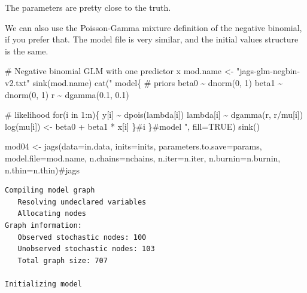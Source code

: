 \documentclass[
  13,
  letterpaper,
]{report}
\newenvironment{Shaded}{\begin{snugshade}}{\end{snugshade}}
\newcommand{\AttributeTok}[1]{\textcolor[rgb]{0.40,0.45,0.13}{#1}}
\newcommand{\CommentTok}[1]{\textcolor[rgb]{0.37,0.37,0.37}{#1}}
\newcommand{\ConstantTok}[1]{\textcolor[rgb]{0.56,0.35,0.01}{#1}}
\newcommand{\FunctionTok}[1]{\textcolor[rgb]{0.28,0.35,0.67}{#1}}
\newcommand{\NormalTok}[1]{\textcolor[rgb]{0.00,0.23,0.31}{#1}}
\newcommand{\OtherTok}[1]{\textcolor[rgb]{0.00,0.23,0.31}{#1}}
\newcommand{\StringTok}[1]{\textcolor[rgb]{0.13,0.47,0.30}{#1}}
\begin{document}
The parameters are pretty close to the truth.

We can also use the Poisson-Gamma mixture definition of the negative
binomial, if you prefer that. The model file is very similar, and the
initial values structure is the same.

\begin{Shaded}
\begin{Highlighting}[]
\CommentTok{\# Negative binomial GLM with one predictor x}
\NormalTok{mod.name }\OtherTok{\textless{}{-}} \StringTok{"jags{-}glm{-}negbin{-}v2.txt"}
\FunctionTok{sink}\NormalTok{(mod.name)}
\FunctionTok{cat}\NormalTok{(}\StringTok{"}
\StringTok{    model\{}
\StringTok{        \# priors}
\StringTok{        beta0 \textasciitilde{} dnorm(0, 1)}
\StringTok{        beta1 \textasciitilde{} dnorm(0, 1)}
\StringTok{        r \textasciitilde{} dgamma(0.1, 0.1)}

\StringTok{        \# likelihood}
\StringTok{        for(i in 1:n)\{}
\StringTok{            y[i] \textasciitilde{} dpois(lambda[i])}
\StringTok{            lambda[i] \textasciitilde{} dgamma(r, r/mu[i])}
\StringTok{            log(mu[i]) \textless{}{-} beta0 + beta1 * x[i]}
\StringTok{            }
\StringTok{        \}\#i}
\StringTok{    \}\#model}
\StringTok{"}\NormalTok{, }\AttributeTok{fill=}\ConstantTok{TRUE}\NormalTok{)}
\FunctionTok{sink}\NormalTok{()}
\end{Highlighting}
\end{Shaded}

\begin{Shaded}
\begin{Highlighting}[]
\NormalTok{mod04 }\OtherTok{\textless{}{-}} \FunctionTok{jags}\NormalTok{(}\AttributeTok{data=}\NormalTok{in.data, }\AttributeTok{inits=}\NormalTok{inits,}
              \AttributeTok{parameters.to.save=}\NormalTok{params,}
              \AttributeTok{model.file=}\NormalTok{mod.name,}
              \AttributeTok{n.chains=}\NormalTok{nchains, }\AttributeTok{n.iter=}\NormalTok{n.iter,}
              \AttributeTok{n.burnin=}\NormalTok{n.burnin, }\AttributeTok{n.thin=}\NormalTok{n.thin)}\CommentTok{\#jags}
\end{Highlighting}
\end{Shaded}

\begin{verbatim}
Compiling model graph
   Resolving undeclared variables
   Allocating nodes
Graph information:
   Observed stochastic nodes: 100
   Unobserved stochastic nodes: 103
   Total graph size: 707

Initializing model
\end{verbatim}
\end{document}
